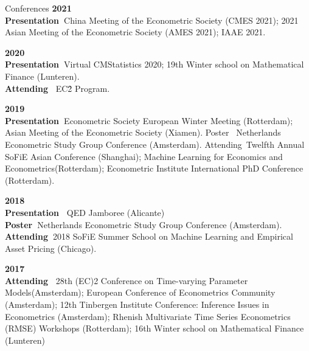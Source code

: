 \documentclass{resume} %
\begin{document}
\begin{rSection}{Conferences}
	\textbf{2021}\\
\textbf{Presentation~}{}{}{}{China Meeting of the Econometric Society (CMES 2021);  2021 Asian Meeting of the Econometric Society (AMES 2021); IAAE 2021.}


\vspace{1mm}
	 
 \textbf{2020}\\
 \textbf{Presentation~}{}{}{}{Virtual CMStatistics 2020; 19th Winter school on Mathematical Finance (Lunteren). }\\
  \textbf{Attending~}{}{}{}{ EC\^2 Program. }
 

 \vspace{1mm}
 \textbf{2019}\\
 \textbf{Presentation~}{}{}{}{Econometric Society European Winter Meeting (Rotterdam); Asian Meeting of the Econometric Society (Xiamen).}
 \textbf{}{Poster~}{}{}{}{ Netherlands Econometric Study Group Conference (Amsterdam).}
 \textbf{}{Attending~}{}{}{}{Twelfth Annual SoFiE Asian Conference (Shanghai); Machine Learning for Economics and Econometrics(Rotterdam);  Econometric Institute International PhD Conference (Rotterdam).}
	
	\vspace{1mm}
 \textbf{2018}\\
\textbf{Presentation~} {QED Jamboree (Alicante)}\\
 \textbf{Poster~}{}{}{}{Netherlands Econometric Study Group Conference (Amsterdam).}\\
 \textbf{Attending~}{}{}{}{2018 SoFiE Summer School on Machine Learning and Empirical Asset Pricing (Chicago).}
	
	\vspace{1mm}
 \textbf{2017}\\
 \textbf{Attending~} {28th (EC)2 Conference on Time-varying Parameter Models(Amsterdam); European Conference of Econometrics Community (Amsterdam); 12th Tinbergen Institute Conference: Inference Issues in Econometrics (Amsterdam); Rhenish Multivariate Time Series Econometrics (RMSE) Workshops (Rotterdam); 16th Winter school on Mathematical Finance (Lunteren)}
	
	
	
\end{rSection}
 
  
\end{document}

